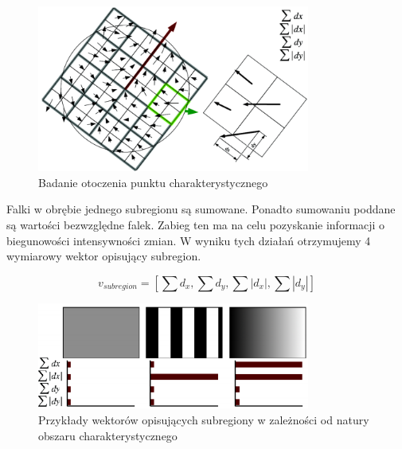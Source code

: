 \begin{figure}[!htb]
\centering
\includegraphics[width=0.8\textwidth]{pict/02/surf/surf_bay_scale_descriptor.png}
\caption{Badanie otoczenia punktu charakterystycznego}
\label{fig:surf_bay_scale_descriptor}
\end{figure}

Falki w obrębie jednego subregionu są sumowane. Ponadto sumowaniu poddane są wartości bezwzględne falek. Zabieg ten ma na celu pozyskanie informacji o biegunowości intensywności zmian. W wyniku tych działań otrzymujemy 4 wymiarowy wektor opisujący subregion.

\begin{equation}
v_{subregion} = \left[ \sum d_x,\sum d_y,\sum |d_x|,\sum |d_y|\right] 
\end{equation}

\begin{figure}[!htb]
\centering
\includegraphics[width=0.8\textwidth]{pict/02/surf/surf_bay_gradient.png}
\caption{Przykłady wektorów opisujących subregiony w zależności od natury obszaru charakterystycznego}
\label{fig:surf_bay_gradient}
\end{figure}

